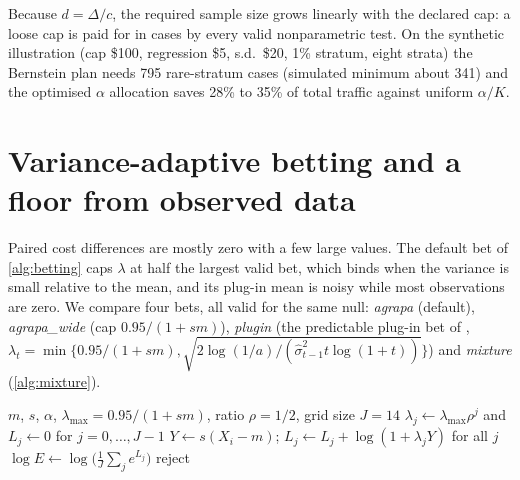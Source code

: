 \documentclass[11pt]{article}
\theoremstyle{definition}
\theoremstyle{remark}
\newcommand{\1}{\mathbf{1}}
\begin{document}
Because $d=\Delta/c$, the required sample size grows linearly with the declared cap: a loose cap is paid for in cases by every valid nonparametric test. On the synthetic illustration (cap \$100, regression \$5, s.d.\ \$20, 1\% stratum, eight strata) the Bernstein plan needs 795 rare-stratum cases (simulated minimum about 341) and the optimised $\alpha$ allocation saves 28\% to 35\% of total traffic against uniform $\alpha/K$.

\section{Variance-adaptive betting and a floor from observed data}\label{sec:betting}

Paired cost differences are mostly zero with a few large values. The default bet of \cref{alg:betting} caps $\lambda$ at half the largest valid bet, which binds when the variance is small relative to the mean, and its plug-in mean is noisy while most observations are zero. We compare four bets, all valid for the same null: \emph{agrapa} (default), \emph{agrapa\_wide} (cap $0.95/(1+sm)$), \emph{plugin} (the predictable plug-in bet of \citealp{waudbysmith2023}, $\lambda_t=\min\{0.95/(1+sm),\sqrt{2\log(1/a)/(\hat\sigma^2_{t-1}t\log(1+t))}\}$) and \emph{mixture} (\cref{alg:mixture}).

\begin{algorithm}[t]
\caption{Grid mixture of constant bets}\label{alg:mixture}
\begin{algorithmic}[1]
\Require $m$, $s$, $\alpha$, $\lambda_{\max}=0.95/(1+sm)$, ratio $\rho=1/2$, grid size $J=14$
\State $\lambda_j\gets\lambda_{\max}\rho^j$ and $L_j\gets0$ for $j=0,\dots,J-1$
  \State $Y\gets s(X_i-m)$; \quad $L_j\gets L_j+\log(1+\lambda_jY)$ for all $j$
  \State $\log E\gets\log\big(\frac1J\sum_j e^{L_j}\big)$ 
   \Return reject \EndIf
\EndFor
\end{algorithmic}
\end{algorithm}
\end{document}
